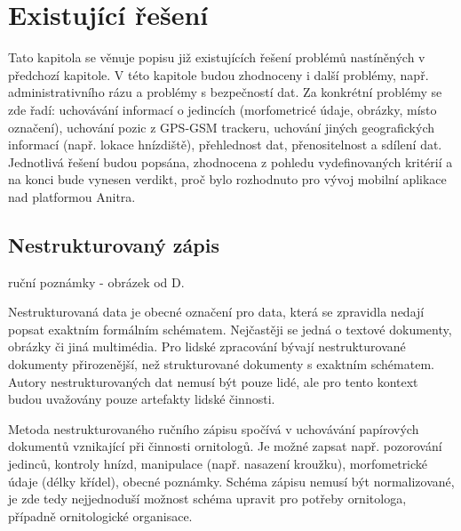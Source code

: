 
\chapter{Existující řešení}

Tato kapitola se věnuje popisu již existujících řešení problémů nastíněných v předchozí kapitole. V této kapitole budou zhodnoceny i další problémy, např. administrativního rázu a problémy s bezpečností dat. Za konkrétní problémy se zde řadí: uchovávání informací o jedincích (morfometricé údaje, obrázky, místo označení), uchování pozic z GPS-GSM trackeru, uchování jiných geografických informací (např. lokace hnízdiště), přehlednost dat, přenositelnost a sdílení dat. Jednotlivá řešení budou popsána, zhodnocena z pohledu vydefinovaných kritérií a na konci bude vynesen verdikt, proč bylo rozhodnuto pro vývoj mobilní aplikace nad platformou Anitra. 


\section{Nestrukturovaný zápis}

ruční poznámky - obrázek od D.

Nestrukturovaná data je obecné označení pro data, která se zpravidla nedají popsat exaktním formálním schématem. Nejčastěji se jedná o textové dokumenty, obrázky či jiná multimédia. Pro lidské zpracování bývají nestrukturované dokumenty přirozenější, než strukturované dokumenty s exaktním schématem. Autory nestrukturovaných dat nemusí být pouze lidé, ale pro tento kontext budou uvažovány pouze artefakty lidské činnosti.


Metoda nestrukturovaného ručního zápisu spočívá v uchovávání papírových dokumentů vznikající při činnosti ornitologů. Je možné zapsat např. pozorování jedinců, kontroly hnízd, manipulace (např. nasazení kroužku), morfometrické údaje (délky křídel), obecné poznámky. Schéma zápisu nemusí být normalizované, je zde tedy nejjednoduší možnost schéma upravit pro potřeby ornitologa, případně ornitologické organisace.

